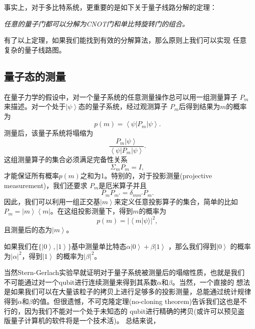 事实上，对于多比特系统，更重要的是如下关于量子线路分解的定理：

\emph{任意的量子门都可以分解为CNOT门和单比特旋转门的组合。}

有了以上定理，如果我们能找到有效的分解算法，那么原则上我们可以实现
任意复杂的量子线路图。

\subsection{量子态的测量}

在量子力学的假设中，对一个量子系统的任意测量操作总可以用一组测量算子
$P_m$来描述。对一个处于$\left\vert \psi\right\rangle$态的量子系统，经过观测算子 $P_m$后得到结果为$m$的概率为
\begin{equation}
    p(m) =\left\langle \psi \right\vert P_m \left\vert \psi\right\rangle.
\end{equation}
测量后，该量子系统将塌缩为
\begin{equation}
    \frac{P_m \left\vert \psi\right\rangle}{\left\langle \psi \right\vert P_m \left\vert \psi\right\rangle}.
\end{equation}
这组测量算子的集合必须满足完备性关系
\begin{equation}
  \Sigma_m P_m = I,
\end{equation}
才能保证所有概率$p(m)$之和为1。特别的，对于投影测量(projective measurement)，我们还要求 $P_m$是厄米算子并且
\begin{equation}
P_m P_{m'} = \delta_{mm'}P_m.
\end{equation}
因此，我们可以利用一组正交基$\left\vert m \right\rangle$来定义任意投影算子的集合，简单的比如$P_m = \left\vert m \right\rangle \left\langle m \right\vert $。在这组投影测量下，得到$m$的概率为
 \begin{equation}
    p(m) = |\left\langle m \right\vert \psi  \rangle |^2,
\end{equation}
且测量后的态为$\left\vert m \right\rangle$。

如果我们在$\{ \left\vert 0 \right\rangle , \left\vert 1 \right\rangle\}$基中测量单比特态$ \alpha  \left\vert 0 \right\rangle + \beta  \left\vert 1 \right\rangle$ ，那么我们得到$\left\vert 0 \right\rangle$ 的概率为$|\alpha|^2$，得到$\left\vert 1 \right\rangle$ 的概率为$|\beta|^2$。

当然Stern-Gerlach实验早就证明对于量子系统被测量后的塌缩性质，也就是我们
不可能通过对一个qubit进行连续测量来得到其系数$\alpha$和$\beta$。当然，一个直接的
想法是如果我们可以在大量该粒子的拷贝上进行足够多的投影测量，总能通过统计规律
得到$\alpha$和$\beta$的值。但很遗憾，不可克隆定理(no-cloning theorem)\cite{Dieks,nocloning}告诉我们这也是不行的，因为我们不能对一个处于未知态的
qubit进行精确的拷贝(或许可以预见盗版量子计算机的软件将是一个技术活)。 总结来说，

